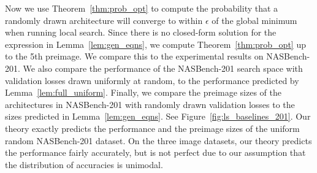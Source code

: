 Now we use Theorem~\ref{thm:prob_opt} to compute the 
probability that a randomly drawn architecture will converge to within $\epsilon$
of the global minimum when running local search.
Since there is no closed-form solution for the expression in Lemma~\ref{lem:gen_eqns},
we compute Theorem~\ref{thm:prob_opt} up to the 5th preimage.
We compare this to the experimental results on NASBench-201.
We also compare the performance of the NASBench-201 search space with validation losses drawn uniformly at random, 
to the performance predicted by Lemma~\ref{lem:full_uniform}.
Finally, we compare the preimage sizes of the architectures in NASBench-201 with
randomly drawn validation losses to the sizes predicted in Lemma~\ref{lem:gen_eqns}.
See Figure~\ref{fig:ls_baselines_201}.
Our theory exactly predicts the performance and the preimage sizes of the uniform 
random NASBench-201 dataset.
On the three image datasets, our theory predicts the performance
fairly accurately, but is not perfect due to our assumption that the distribution
of accuracies is unimodal.

